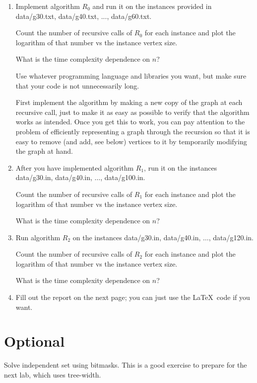 \documentclass{tufte-handout}
\begin{document}
\begin{enumerate}
\item Implement algorithm $R_0$ and run it on the instances provided in
  data/g30.txt, data/g40.txt, ..., data/g60.txt.
  
  Count the number of recursive calls of $R_0$ for each instance and plot the
  logarithm of that number vs the instance vertex size. 
  
  What is the time complexity dependence on $n$?
  
  Use whatever programming language and libraries you want, but make
  sure that your code is not unnecessarily long.

  First implement the algorithm by making a new copy of the graph at
  each recursive call, just to make it as easy as possible to verify
  that the algorithm works as intended. Once you get this to work, you
  can pay attention to the problem of efficiently representing a graph
  through the recursion so that it is easy to remove (and add, see
  below) vertices to it by temporarily modifying the graph at hand.

\item After you have implemented algorithm $R_1$, run it on the instances
 data/g30.in, data/g40.in, $\ldots$, data/g100.in.

  Count the number of recursive calls of $R_1$ for each instance and plot the
  logarithm of that number vs the instance vertex size.
  
  What is the time complexity dependence on $n$?

\item Run algorithm $R_2$ on the instances data/g30.in, data/g40.in,
  $\ldots$, data/g120.in.

  Count the number of recursive calls of $R_2$ for each instance and plot the
  logarithm of that number vs the instance vertex size. 
  
  What is the time complexity dependence on $n$?

\item Fill out the report on the next page; you can just use the
  \LaTeX\ code if you want.
\end{enumerate}

\section{Optional}
Solve independent set using bitmasks. This is a good exercise to prepare for the next lab, which 
uses tree-width.
\end{document}
